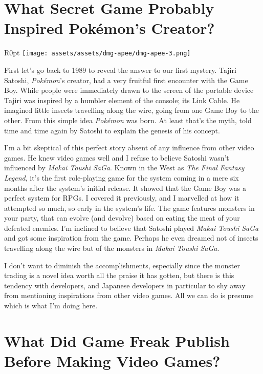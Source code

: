 \documentclass{book}
\begin{document}
\FloatBarrier\needspace{10mm}\section*{What Secret Game Probably Inspired Pokémon’s Creator?}\nopagebreak[4]
\begin{wrapfigure}{R}{0pt} \texttt{[image: assets/assets/dmg-apee/dmg-apee-3.png]}\end{wrapfigure}
First let’s go back to 1989 to reveal the answer to our first mystery. Tajiri Satoshi, \emph{Pokémon}’s creator, had a very fruitful first encounter with the Game Boy. While people were immediately drawn to the screen of the portable device Tajiri was inspired by a humbler element of the console; its Link Cable. He imagined little insects travelling along the wire, going from one Game Boy to the other. From this simple idea \emph{Pokémon} was born. At least that’s the myth, told time and time again by Satoshi to explain the genesis of his concept.

I’m a bit skeptical of this perfect story absent of any influence from other video games. He knew video games well and I refuse to believe Satoshi wasn’t influenced by \emph{Makai Toushi SaGa}. Known in the West as \emph{The Final Fantasy Legend}, it’s the first role-playing game for the system coming in a mere six months after the system’s initial release. It showed that the Game Boy was a perfect system for RPGs. I covered it previously, and I marvelled at how it attempted so much, so early in the system’s life. The game features monsters in your party, that can evolve (and devolve) based on eating the meat of your defeated enemies. I’m inclined to believe that Satoshi played \emph{Makai Toushi SaGa} and got some inspiration from the game. Perhaps he even dreamed not of insects travelling along the wire but of the monsters in \emph{Makai Toushi SaGa}.

I don’t want to diminish the accomplishments, especially since the monster trading is a novel idea worth all the praise it has gotten, but there is this tendency with developers, and Japanese developers in particular to shy away from mentioning inspirations from other video games. All we can do is presume which is what I’m doing here.

\FloatBarrier\needspace{10mm}\section*{What Did Game Freak Publish Before Making Video Games?}\nopagebreak[4]
\end{document}
